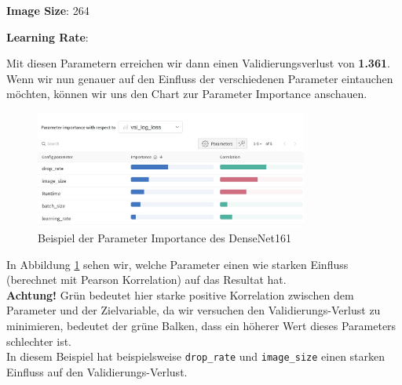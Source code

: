 \documentclass{article}
\begin{document}
\textbf{Image Size}: 264

\textbf{Learning Rate}: 


\noindent
Mit diesen Parametern erreichen wir dann einen Validierungsverlust von \textbf{1.361}. Wenn wir nun genauer auf den Einfluss der verschiedenen Parameter eintauchen möchten, können wir uns den Chart zur Parameter Importance anschauen.

\newpage

\begin{figure}[!h]
    \centering
    \includegraphics[width=0.8\textwidth]{images/parameter_importance_example.png}
    \caption{\label{fig:hyperparameter_importance_example}Beispiel der Parameter Importance des DenseNet161}
\end{figure}

In Abbildung \ref{fig:hyperparameter_importance_example} sehen wir, welche Parameter einen wie starken Einfluss (berechnet mit Pearson Korrelation) auf das Resultat hat. \\

\textbf{Achtung!} Grün bedeutet hier starke positive Korrelation zwischen dem Parameter und der Zielvariable, da wir versuchen den Validierungs-Verlust zu minimieren, bedeutet der grüne Balken, dass ein höherer Wert dieses Parameters schlechter ist.\\

\noindent
In diesem Beispiel hat beispielsweise \texttt{drop\_rate} und \texttt{image\_size} einen starken Einfluss auf den Validierungs-Verlust.
\end{document}
